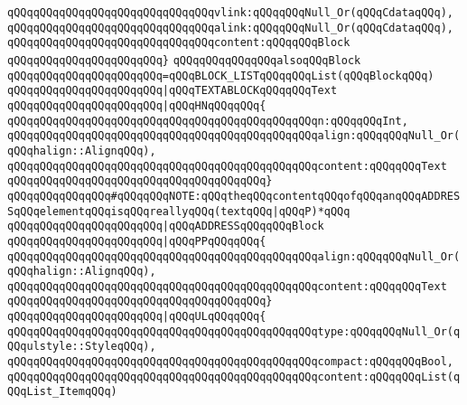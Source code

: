 \verb|qQQqqQQqqQQqqQQqqQQqqQQqqQQqqQQqvlink:qQQqqQQqNull_Or(qQQqCdataqQQq),|\newline
\verb|qQQqqQQqqQQqqQQqqQQqqQQqqQQqqQQqalink:qQQqqQQqNull_Or(qQQqCdataqQQq),|\newline
\verb|qQQqqQQqqQQqqQQqqQQqqQQqqQQqqQQqcontent:qQQqqQQqBlock|\newline
\verb|qQQqqQQqqQQqqQQqqQQqqQQq}|\newline
\newline
\verb|qQQqqQQqqQQqqQQqalsoqQQqBlock|\newline
\verb|qQQqqQQqqQQqqQQqqQQqqQQq=qQQqBLOCK_LISTqQQqqQQqList(qQQqBlockqQQq)|\newline
\verb|qQQqqQQqqQQqqQQqqQQqqQQq|\verb#|qQQqTEXTABLOCKqQQqqQQqText#\newline
\verb|qQQqqQQqqQQqqQQqqQQqqQQq|\verb#|qQQqHNqQQqqQQq{#\newline
\verb|qQQqqQQqqQQqqQQqqQQqqQQqqQQqqQQqqQQqqQQqqQQqqQQqn:qQQqqQQqInt,|\newline
\verb|qQQqqQQqqQQqqQQqqQQqqQQqqQQqqQQqqQQqqQQqqQQqqQQqalign:qQQqqQQqNull_Or(qQQqhalign::AlignqQQq),|\newline
\verb|qQQqqQQqqQQqqQQqqQQqqQQqqQQqqQQqqQQqqQQqqQQqqQQqcontent:qQQqqQQqText|\newline
\verb|qQQqqQQqqQQqqQQqqQQqqQQqqQQqqQQqqQQqqQQq}|\newline
\verb|qQQqqQQqqQQqqQQq#qQQqqQQqNOTE:qQQqtheqQQqcontentqQQqofqQQqanqQQqADDRESSqQQqelementqQQqisqQQqreallyqQQq(textqQQq|\verb#|qQQqP)*qQQq#\newline
\verb|qQQqqQQqqQQqqQQqqQQqqQQq|\verb#|qQQqADDRESSqQQqqQQqBlock#\newline
\verb|qQQqqQQqqQQqqQQqqQQqqQQq|\verb#|qQQqPPqQQqqQQq{#\newline
\verb|qQQqqQQqqQQqqQQqqQQqqQQqqQQqqQQqqQQqqQQqqQQqqQQqalign:qQQqqQQqNull_Or(qQQqhalign::AlignqQQq),|\newline
\verb|qQQqqQQqqQQqqQQqqQQqqQQqqQQqqQQqqQQqqQQqqQQqqQQqcontent:qQQqqQQqText|\newline
\verb|qQQqqQQqqQQqqQQqqQQqqQQqqQQqqQQqqQQqqQQq}|\newline
\verb|qQQqqQQqqQQqqQQqqQQqqQQq|\verb#|qQQqULqQQqqQQq{#\newline
\verb|qQQqqQQqqQQqqQQqqQQqqQQqqQQqqQQqqQQqqQQqqQQqqQQqtype:qQQqqQQqNull_Or(qQQqulstyle::StyleqQQq),|\newline
\verb|qQQqqQQqqQQqqQQqqQQqqQQqqQQqqQQqqQQqqQQqqQQqqQQqcompact:qQQqqQQqBool,|\newline
\verb|qQQqqQQqqQQqqQQqqQQqqQQqqQQqqQQqqQQqqQQqqQQqqQQqcontent:qQQqqQQqList(qQQqList_ItemqQQq)|\newline
